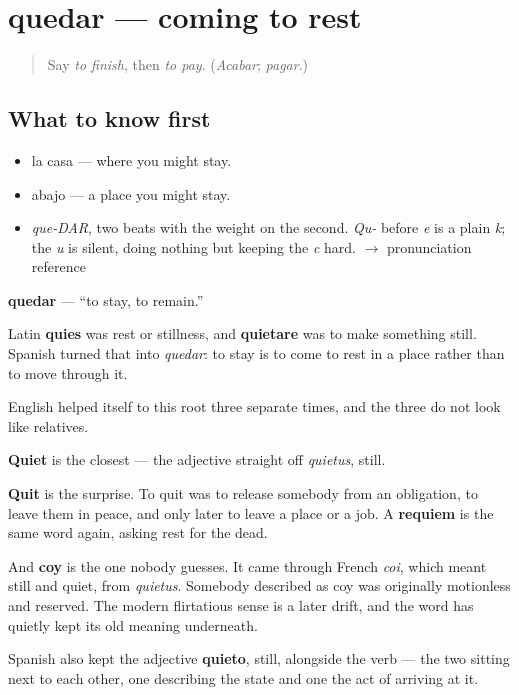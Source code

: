 \section[quedar]{quedar — coming to rest}

\label{lesson:ES-C382-quedar}



\begin{quote}
Say \emph{to finish}, then \emph{to pay}. (\emph{Acabar}; \emph{pagar}.)
\end{quote}

\subsection*{What to know first}
\begin{itemize}
\raggedright
  \item la casa — where you might stay.
  \item abajo — a place you might stay.
\end{itemize}

\begin{sounds}
\begin{itemize}
\raggedright
  \item \emph{que-DAR}, two beats with the weight on the second. \emph{Qu-} before \emph{e} is a plain \emph{k}; the \emph{u} is silent, doing nothing but keeping the \emph{c} hard. $\to$ pronunciation reference
\end{itemize}
\end{sounds}

\begin{cousinweb}
\textbf{quedar} — \textquotedblleft{}to stay, to remain.\textquotedblright{}

Latin \textbf{quies} was rest or stillness, and \textbf{quietare} was to make something still. Spanish turned that into \emph{quedar}: to stay is to come to rest in a place rather than to move through it.

English helped itself to this root three separate times, and the three do not look like relatives.

\textbf{Quiet} is the closest — the adjective straight off \emph{quietus}, still.

\textbf{Quit} is the surprise. To quit was to release somebody from an obligation, to leave them in peace, and only later to leave a place or a job. A \textbf{requiem} is the same word again, asking rest for the dead.

And \textbf{coy} is the one nobody guesses. It came through French \emph{coi}, which meant still and quiet, from \emph{quietus}. Somebody described as coy was originally motionless and reserved. The modern flirtatious sense is a later drift, and the word has quietly kept its old meaning underneath.

Spanish also kept the adjective \textbf{quieto}, still, alongside the verb — the two sitting next to each other, one describing the state and one the act of arriving at it.
\end{cousinweb}

